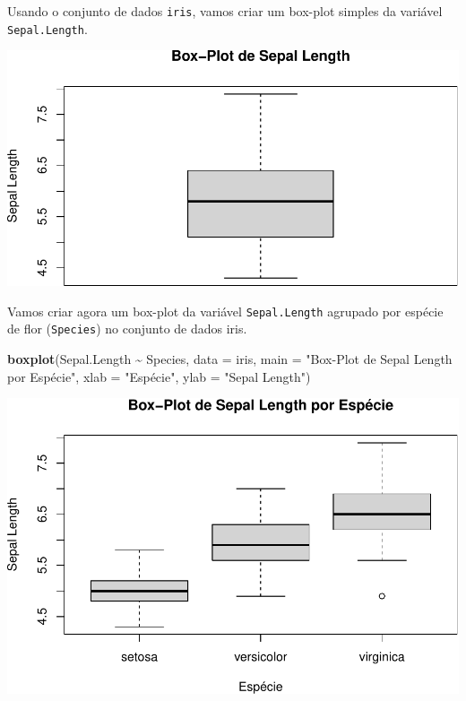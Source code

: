 \documentclass[
]{book}
\newenvironment{Shaded}{\begin{snugshade}}{\end{snugshade}}
\newcommand{\AttributeTok}[1]{\textcolor[rgb]{0.13,0.29,0.53}{#1}}
\newcommand{\FunctionTok}[1]{\textcolor[rgb]{0.13,0.29,0.53}{\textbf{#1}}}
\newcommand{\NormalTok}[1]{#1}
\newcommand{\SpecialCharTok}[1]{\textcolor[rgb]{0.81,0.36,0.00}{\textbf{#1}}}
\newcommand{\StringTok}[1]{\textcolor[rgb]{0.31,0.60,0.02}{#1}}
\begin{document}
Usando o conjunto de dados \texttt{iris}, vamos criar um box-plot simples da
variável \texttt{Sepal.Length}.

\begin{Shaded}
\end{Shaded}

\includegraphics{introR_files/figure-latex/unnamed-chunk-178-1.pdf}

Vamos criar agora um box-plot da variável \texttt{Sepal.Length} agrupado por
espécie de flor (\texttt{Species}) no conjunto de dados iris.

\begin{Shaded}
\begin{Highlighting}[]
\FunctionTok{boxplot}\NormalTok{(Sepal.Length }\SpecialCharTok{\textasciitilde{}}\NormalTok{ Species, }
        \AttributeTok{data =}\NormalTok{ iris, }
        \AttributeTok{main =} \StringTok{"Box{-}Plot de Sepal Length por Espécie"}\NormalTok{, }
        \AttributeTok{xlab =} \StringTok{"Espécie"}\NormalTok{, }
        \AttributeTok{ylab =} \StringTok{"Sepal Length"}\NormalTok{)}
\end{Highlighting}
\end{Shaded}

\includegraphics{introR_files/figure-latex/unnamed-chunk-179-1.pdf}
\end{document}
